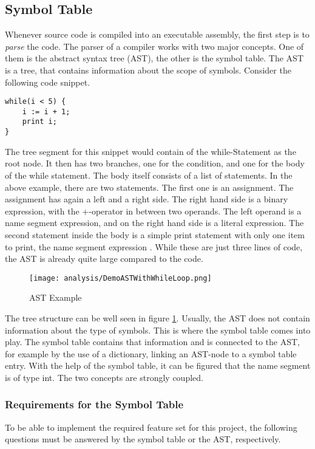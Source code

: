 \subsection{Symbol Table}
Whenever source code is compiled into an executable assembly, the first step is to \textit{parse} the code.
The parser of a compiler works with two major concepts.
One of them is the abstract syntax tree (AST), the other is the symbol table.
The AST is a tree, that contains information about the scope of symbols.
Consider the following code snippet.

\begin{lstlisting}[language=dafny, caption={AST Demo Snippet}, captionpos=b, label={lst:astsnipped}]
while(i < 5) {
    i := i + 1;
    print i;
}
\end{lstlisting}

The tree segment for this snippet would contain of the while-Statement as the root node.
It then has two branches, one for the condition, and one for the body of the while statement.
The body itself consists of a list of statements.
In the above example, there are two statements.
The first one is an assignment.
The assignment has again a left and a right side.
The right hand side is a binary expression, with the +-operator in between two operands.
The left operand is a name segment expression, and on the right hand side is a literal expression.
The second statement inside the body is a simple print statement with only one item to print, the name segment expression .
While these are just three lines of code, the AST is already quite large compared to the code.\\

\begin{figure}[H]
    \centering
    \texttt{[image: analysis/DemoASTWithWhileLoop.png]}
    \caption{AST Example}
    \label{fig:ast_for_example}
\end{figure}

The tree structure can be well seen in figure \ref{fig:ast_for_example}.
Usually, the AST does not contain information about the type of symbols.
This is where the symbol table comes into play.
The symbol table contains that information and is connected to the AST, for example by the use of a dictionary, linking an AST-node to a symbol table entry.
With the help of the symbol table, it can be figured that the name segment  is of type int.
The two concepts are strongly coupled.

\subsubsection{Requirements for the Symbol Table}
To be able to implement the required feature set for this project, the following questions must be answered by the symbol table or the AST, respectively.

